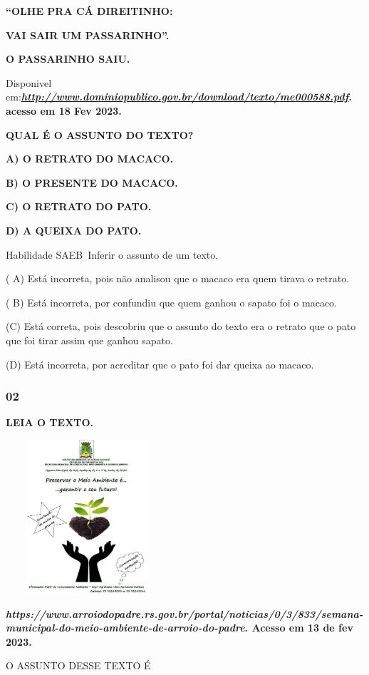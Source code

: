 \begin{escola}
\textbf{“OLHE PRA CÁ DIREITINHO:}

\textbf{VAI SAIR UM PASSARINHO”.}

\textbf{O PASSARINHO SAIU.}

Disponivel
em:\textbf{\href{http://www.dominiopublico.gov.br/download/texto/me000588.pdf}{\emph{http://www.dominiopublico.gov.br/download/texto/me000588.pdf}}.
acesso em 18 Fev 2023.}

\textbf{QUAL É O ASSUNTO DO TEXTO?}

\textbf{A) O RETRATO DO MACACO.}

\textbf{B) O PRESENTE DO MACACO.}

\textbf{C) O RETRATO DO PATO.}

\textbf{D) A QUEIXA DO PATO.}

Habilidade SAEB~Inferir o assunto de um texto.

( A) Está incorreta, pois não analisou que o macaco era quem tirava o
retrato.

( B) Está incorreta, por confundiu que quem ganhou o sapato foi o
macaco.

(C) Está correta, pois descobriu que o assunto do texto era o retrato
que o pato que foi tirar assim que ganhou sapato.

(D) Está incorreta, por acreditar que o pato foi dar queixa ao macaco.

\subsubsection{02 }\label{section-17}

\textbf{LEIA O TEXTO.}

\includegraphics[width=2.37500in,height=2.25000in]{media/image166.jpg}

\textbf{\emph{https://www.arroiodopadre.rs.gov.br/portal/noticias/0/3/833/semana-municipal-do-meio-ambiente-de-arroio-do-padre}.
Acesso em 13 de fev 2023.}

O ASSUNTO DESSE TEXTO É


\end{escola}
